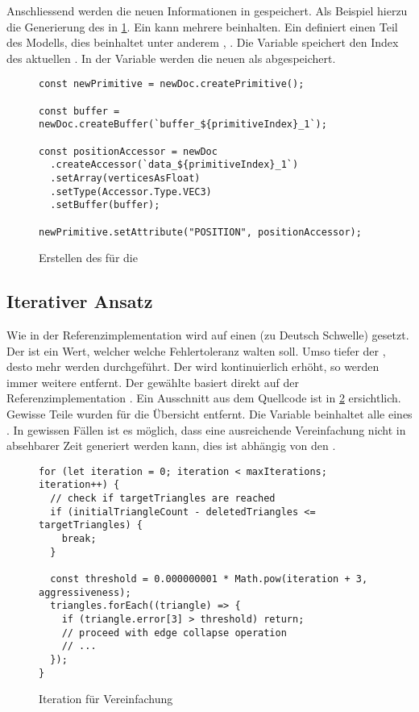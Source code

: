 Anschliessend werden die neuen Informationen in  gespeichert. Als Beispiel hierzu die Generierung des  in \ref{code:bufferCreation}. Ein  kann mehrere  beinhalten. Ein  definiert einen Teil des Modells, dies beinhaltet unter anderem , . Die Variable  speichert den Index des aktuellen . In der Variable  werden die neuen  als  abgespeichert.

\begin{figure}[H]
  \begin{lstlisting}[style=JavaScript]
const newPrimitive = newDoc.createPrimitive();

const buffer = newDoc.createBuffer(`buffer_${primitiveIndex}_1`);

const positionAccessor = newDoc
  .createAccessor(`data_${primitiveIndex}_1`)
  .setArray(verticesAsFloat)
  .setType(Accessor.Type.VEC3)
  .setBuffer(buffer);

newPrimitive.setAttribute("POSITION", positionAccessor);
  \end{lstlisting}
  \caption{Erstellen des  für die }
  \label{code:bufferCreation}
\end{figure}

\subsection{Iterativer Ansatz}

Wie in der Referenzimplementation wird auf einen  (zu Deutsch Schwelle) gesetzt. Der  ist ein Wert, welcher welche Fehlertoleranz walten soll. Umso tiefer der , desto mehr  werden durchgeführt. Der  wird kontinuierlich erhöht, so werden immer weitere  entfernt. Der gewählte  basiert direkt auf der Referenzimplementation \cite{fastQuadricMeshSimplification}. Ein Ausschnitt aus dem Quellcode ist in \ref{code:thresholdIteration} ersichtlich. Gewisse Teile wurden für die Übersicht entfernt. Die Variable  beinhaltet alle  eines . In gewissen Fällen ist es möglich, dass eine ausreichende Vereinfachung nicht in absehbarer Zeit generiert werden kann, dies ist abhängig von den .

\begin{figure}[H]
  \begin{lstlisting}[style=JavaScript]
for (let iteration = 0; iteration < maxIterations; iteration++) {
  // check if targetTriangles are reached
  if (initialTriangleCount - deletedTriangles <= targetTriangles) {
    break;
  }

  const threshold = 0.000000001 * Math.pow(iteration + 3, aggressiveness);
  triangles.forEach((triangle) => {
    if (triangle.error[3] > threshold) return;
    // proceed with edge collapse operation
    // ...
  });
}
  \end{lstlisting}
  \caption{Iteration für Vereinfachung}
  \label{code:thresholdIteration}
\end{figure}


